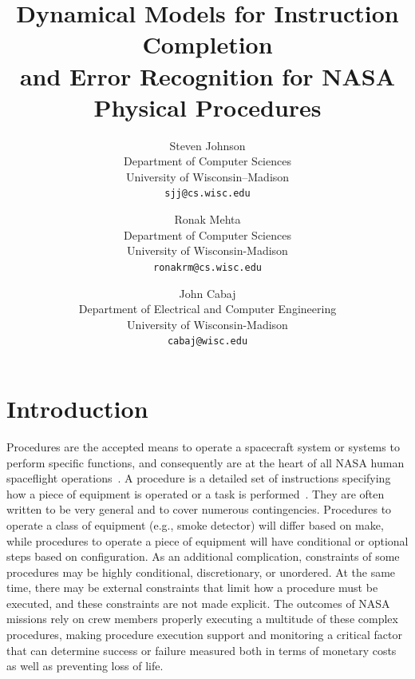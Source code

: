 \documentclass[10pt,twocolumn,letterpaper]{article}
\begin{document}
\title{Dynamical Models for Instruction Completion \\and Error Recognition for NASA Physical Procedures}

\author{Steven Johnson\\
	Department of Computer Sciences\\
	University of Wisconsin--Madison\\
	{\tt\small sjj@cs.wisc.edu}
	\and
	Ronak Mehta\\
	Department of Computer Sciences\\
	University of Wisconsin-Madison\\
	{\tt\small ronakrm@cs.wisc.edu}
	\and
	John Cabaj\\
	Department of Electrical and Computer Engineering\\
	University of Wisconsin-Madison\\
	{\tt\small cabaj@wisc.edu}
}

\maketitle

\begin{abstract}

\end{abstract}

\section{Introduction}

Procedures are the accepted means to operate a spacecraft system or systems to perform specific functions, and consequently are at the heart of all NASA human spaceflight operations~\cite{kortenkamp2008procedure}. A procedure is a detailed set of instructions specifying how a piece of equipment is operated or a task is performed~\cite{frank2010plans}. They are often written to be very general and to cover numerous contingencies. Procedures to operate a class of equipment (e.g., smoke detector) will differ based on make, while procedures to operate a piece of equipment will have conditional or optional steps based on configuration. As an additional complication, constraints of some procedures may be highly conditional, discretionary, or unordered. At the same time, there may be external constraints that limit how a procedure must be executed, and these constraints are not made explicit. The outcomes of NASA missions rely on crew members properly executing a multitude of these complex procedures, making procedure execution support and monitoring a critical factor that can determine success or failure measured both in terms of monetary costs as well as preventing loss of life.
\end{document}
